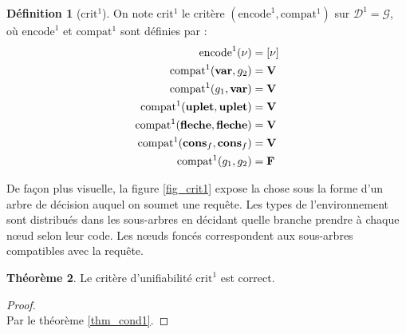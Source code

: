 \documentclass[a4paper]{report}
\newenvironment{preuve} 
	{\begin{proof}~\\} 
	{\end{proof}}
\theoremstyle{definition}
\newtheorem{theoreme}{Théorème}
\newtheorem{definition}[theoreme]{Définition}
\newcommand{\G}{\mathscr{G}}
\begin{document}
\begin{definition}[$\mathrm{crit}^1$]
	On note $\mathrm{crit}^1$ le critère $(\mathrm{encode}^1, \mathrm{compat}^1)$ sur $\mathscr{D}^1 = \G$, où $\mathrm{encode}^1$ et $\mathrm{compat}^1$ sont définies par :
	\begin{align*}
			\mathrm{encode}^1 (\nu) &=
			[ \nu ]
		\\
			\mathrm{compat}^1 (\bold{var}, {g}_2) &=
			\bold{V}
		\\
			\mathrm{compat}^1 ({g}_1, \bold{var}) &=
			\bold{V}
		\\
			\mathrm{compat}^1 (\bold{uplet}, \bold{uplet}) &=
			\bold{V}
		\\
			\mathrm{compat}^1 (\bold{fleche}, \bold{fleche}) &=
			\bold{V}
		\\
			\mathrm{compat}^1 (\bold{cons}_f, \bold{cons}_f) &=
			\bold{V}
		\\
			\mathrm{compat}^1 ({g}_1, {g}_2) &=
			\bold{F}
	\end{align*}
\end{definition}

De façon plus visuelle, la figure \ref{fig_crit1} expose la chose sous la forme d'un arbre de décision auquel on soumet une requête. Les types de l'environnement sont distribués dans les sous-arbres en décidant quelle branche prendre à chaque nœud selon leur code. Les nœuds foncés correspondent aux sous-arbres compatibles avec la requête.

\begin{theoreme} \label{thm_crit1}
	Le critère d'unifiabilité $\mathrm{crit}^1$ est correct.
\end{theoreme}

\begin{preuve}
	Par le théorème \ref{thm_cond1}.
\end{preuve}
\end{document}
